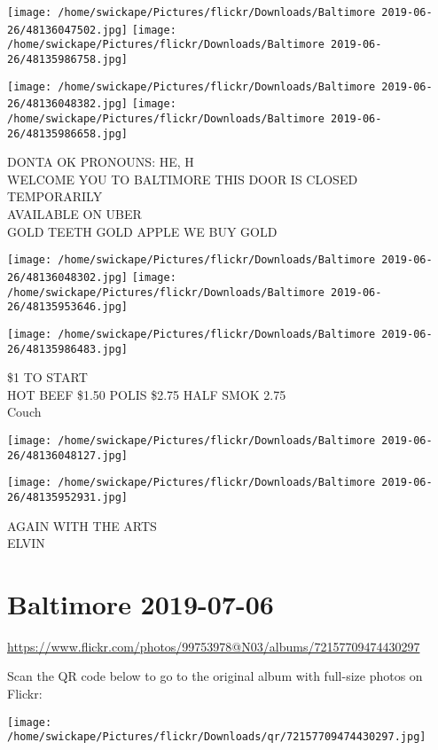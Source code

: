 \documentclass[10pt,letterpaper]{article}
\begin{document}
\texttt{[image: /home/swickape/Pictures/flickr/Downloads/Baltimore 2019-06-26/48136047502.jpg]}
\texttt{[image: /home/swickape/Pictures/flickr/Downloads/Baltimore 2019-06-26/48135986758.jpg]}

\texttt{[image: /home/swickape/Pictures/flickr/Downloads/Baltimore 2019-06-26/48136048382.jpg]}
\texttt{[image: /home/swickape/Pictures/flickr/Downloads/Baltimore 2019-06-26/48135986658.jpg]}

DONTA OK PRONOUNS: HE, H\\
WELCOME YOU TO BALTIMORE THIS DOOR IS CLOSED TEMPORARILY\\
AVAILABLE ON UBER\\
GOLD TEETH GOLD APPLE WE BUY GOLD
\pagebreak

\texttt{[image: /home/swickape/Pictures/flickr/Downloads/Baltimore 2019-06-26/48136048302.jpg]}
\texttt{[image: /home/swickape/Pictures/flickr/Downloads/Baltimore 2019-06-26/48135953646.jpg]}

\vspace{0.25in}
\texttt{[image: /home/swickape/Pictures/flickr/Downloads/Baltimore 2019-06-26/48135986483.jpg]}

\$1 TO START\\
HOT BEEF \$1.50 POLIS \$2.75 HALF SMOK 2.75\\
Couch
\pagebreak

\texttt{[image: /home/swickape/Pictures/flickr/Downloads/Baltimore 2019-06-26/48136048127.jpg]}

\vspace{0.25in}
\texttt{[image: /home/swickape/Pictures/flickr/Downloads/Baltimore 2019-06-26/48135952931.jpg]}

AGAIN WITH THE ARTS\\
ELVIN
\pagebreak

\section*{Baltimore 2019-07-06}

\url{https://www.flickr.com/photos/99753978@N03/albums/72157709474430297}

Scan the QR code below to go to the original album with full-size photos on Flickr:

\texttt{[image: /home/swickape/Pictures/flickr/Downloads/qr/72157709474430297.jpg]}
\pagebreak
\end{document}
